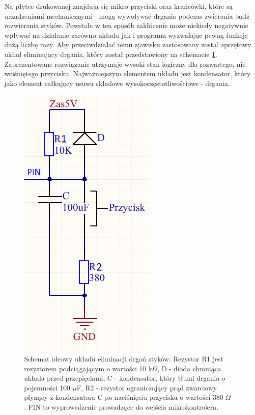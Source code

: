   Na płytce drukowanej znajdują się mikro przyciski oraz krańcówki, które są urządzeniami mechanicznymi - mogą wywoływać drgania podczas zwierania bądź rozwierania styków. Powstałe w ten sposób zakłócenie może niekiedy negatywnie wpływać na działanie zarówno układu jak i programu wyzwalając pewną funkcję dużą liczbę razy. Aby przeciwdziałać temu zjawisku zastosowany został sprzętowy układ eliminujący drgania, który został przedstawiony na schemacie \ref{drg}. Zaprezentowane rozwiązanie utrzymuje wysoki stan logiczny dla rozwartego, nie wciśniętego przycisku. Najważniejszym elementem układu jest kondensator, który jako element całkujący usuwa składowe wysokoczęstotliwościowe - drgania. 
  \newpage
 \begin{figure}[H]
    \begin{center}
      \includegraphics[scale=0.45]{imgs/drgania.png}
 	\caption[Eliminacja drgań styków.]{\small{Schemat ideowy układu eliminacji drgań styków. Rezystor R1 jest rezystorem podciągającym o wartości 10 k$\Omega$, D - dioda chroniąca układa przed przepięciami, C - kondensator, który tłumi drgania o pojemności 100 $\mu$F, R2 - rezystor ograniczający prąd zwarciowy płynący z kondensatora C po naciśnięciu przycisku o wartości 380 $\Omega$. PIN to wyprowadzenie prowadzące do wejścia mikrokontrolera. }}
	\label{drg}
    \end{center}
  \end{figure}   
  
